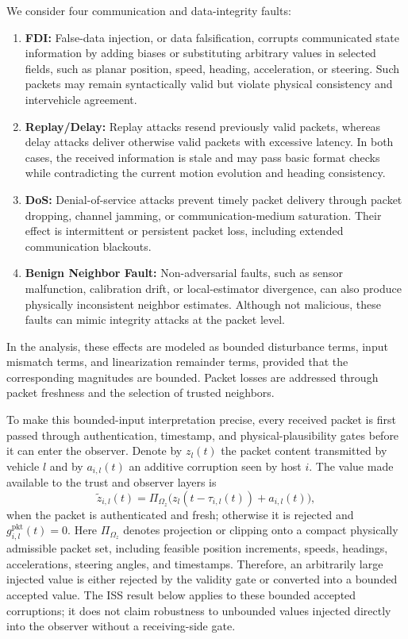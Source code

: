 \documentclass[letterpaper,journal]{IEEEtran}
\begin{document}
We consider four communication and data-integrity faults:
\begin{enumerate}
    \item[(1)] \textbf{FDI:} False-data injection, or data falsification, corrupts communicated state information by adding biases or substituting arbitrary values in selected fields, such as planar position, speed, heading, acceleration, or steering. Such packets may remain syntactically valid but violate physical consistency and intervehicle agreement.
    \item[(2)] \textbf{Replay/Delay:} Replay attacks resend previously valid packets, whereas delay attacks deliver otherwise valid packets with excessive latency. In both cases, the received information is stale and may pass basic format checks while contradicting the current motion evolution and heading consistency.
    \item[(3)] \textbf{DoS:} Denial-of-service attacks prevent timely packet delivery through packet dropping, channel jamming, or communication-medium saturation. Their effect is intermittent or persistent packet loss, including extended communication blackouts.
    \item[(4)] \textbf{Benign Neighbor Fault:} Non-adversarial faults, such as sensor malfunction, calibration drift, or local-estimator divergence, can also produce physically inconsistent neighbor estimates. Although not malicious, these faults can mimic integrity attacks at the packet level.
\end{enumerate}
In the analysis, these effects are modeled as bounded disturbance terms, input mismatch terms, and linearization remainder terms, provided that the corresponding magnitudes are bounded. Packet losses are addressed through packet freshness and the selection of trusted neighbors.

To make this bounded-input interpretation precise, every received packet is first passed through authentication, timestamp, and physical-plausibility gates before it can enter the observer. Denote by $z_l(t)$ the packet content transmitted by vehicle $l$ and by $a_{i,l}(t)$ an additive corruption seen by host $i$. The value made available to the trust and observer layers is
\begin{equation}
    \tilde z_{i,l}(t)
    =
    \Pi_{\Omega_z}\big(z_l(t-\tau_{i,l}(t))+a_{i,l}(t)\big),
    \label{eq_received_packet_gate}
\end{equation}
when the packet is authenticated and fresh; otherwise it is rejected and $g_{i,l}^{\mathrm{pkt}}(t)=0$. Here $\Pi_{\Omega_z}$ denotes projection or clipping onto a compact physically admissible packet set, including feasible position increments, speeds, headings, accelerations, steering angles, and timestamps. Therefore, an arbitrarily large injected value is either rejected by the validity gate or converted into a bounded accepted value. The ISS result below applies to these bounded accepted corruptions; it does not claim robustness to unbounded values injected directly into the observer without a receiving-side gate.
\end{document}
